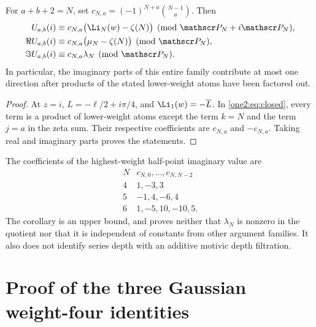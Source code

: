 \begin{corollary}
\label{one2:cor:primitive}
For $a+b+2=N$, set
$c_{N,a}=(-1)^{N+a}\binom{N-1}{a}$.  Then
\begin{align}
 U_{a,b}(i)&\equiv c_{N,a}\bigl(\Li_N(w)-\zeta(N)\bigr)
        \pmod{\mathscr P_N+i\mathscr P_N},\label{one2:eq:complexprimitive}\\
 \Re U_{a,b}(i)&\equiv c_{N,a}\bigl(\mu_N-\zeta(N)\bigr)
        \pmod{\mathscr P_N},\label{one2:eq:realprimitive}\\
 \Im U_{a,b}(i)&\equiv c_{N,a}\lambda_N
        \pmod{\mathscr P_N}.\label{one2:eq:imagprimitive}
\end{align}
In particular, the imaginary parts of this entire family contribute
at most one direction after products of the stated lower-weight
atoms have been factored out.
\end{corollary}
\begin{proof}
At $z=i$, $L=-\ell/2+i\pi/4$, and
$\Li_1(w)=-\overline L$.  In \eqref{one2:eq:closed}, every term is a
product of lower-weight atoms except the term $k=N$ and the term
$j=a$ in the zeta sum.  Their respective coefficients are
$c_{N,a}$ and $-c_{N,a}$.  Taking real and imaginary parts proves the
statements.
\end{proof}

The coefficients of the highest-weight half-point imaginary value are
\[
 \begin{array}{c|l}
 N&c_{N,0},\ldots,c_{N,N-2}\\\hline
 4&1,-3,3\\
 5&-1,4,-6,4\\
 6&1,-5,10,-10,5.
 \end{array}
\]
The corollary is an upper bound, and proves neither that $\lambda_N$
is nonzero in the quotient nor that it is independent of constants
from other argument families.  It also does not identify series
depth with an additive motivic depth filtration.



\section{Proof of the three Gaussian weight-four identities}
\label{one2:sec:triples}

